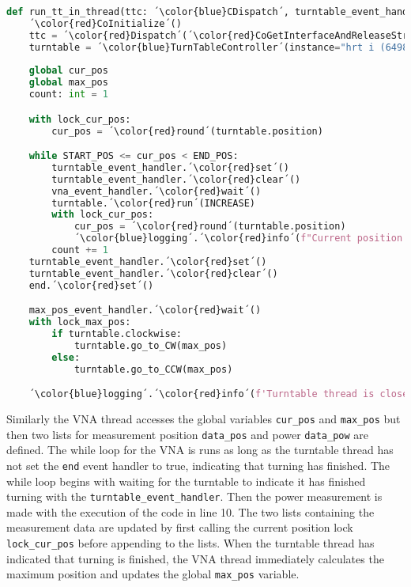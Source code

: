 \begin{lstlisting}[language=Python, caption=Thread function for running VNA.]
def run_tt_in_thread(ttc: ´\color{blue}CDispatch´, turntable_event_handler: ´\color{blue}Event´, vna_event_handler: ´\color{blue}Event´, end: ´\color{blue}Event´, ttc_id) -> None:
    ´\color{red}CoInitialize´()
    ttc = ´\color{red}Dispatch´(´\color{red}CoGetInterfaceAndReleaseStream´(ttc_id, IID_IDispatch))
    turntable = ´\color{blue}TurnTableController´(instance="hrt i (64980128)", ttc=ttc, clockwise=True, start_pos=START_POS)
    
    global cur_pos
    global max_pos
    count: int = 1

    with lock_cur_pos:
        cur_pos = ´\color{red}round´(turntable.position)

    while START_POS <= cur_pos < END_POS:
        turntable_event_handler.´\color{red}set´()
        turntable_event_handler.´\color{red}clear´()
        vna_event_handler.´\color{red}wait´()
        turntable.´\color{red}run´(INCREASE)
        with lock_cur_pos:
            cur_pos = ´\color{red}round´(turntable.position) 
            ´\color{blue}logging´.´\color{red}info´(f"Current position for {turntable.instance} is {cur_pos}.")
        count += 1
    turntable_event_handler.´\color{red}set´()
    turntable_event_handler.´\color{red}clear´()
    end.´\color{red}set´()

    max_pos_event_handler.´\color{red}wait´()
    with lock_max_pos:
        if turntable.clockwise:
            turntable.go_to_CW(max_pos)
        else:
            turntable.go_to_CCW(max_pos)

    ´\color{blue}logging´.´\color{red}info´(f'Turntable thread is closed. {count} positions measured.')
\end{lstlisting}

Similarly the VNA thread accesses the global variables \verb+cur_pos+ and \verb+max_pos+ but then two lists for measurement position \verb+data_pos+ and power \verb+data_pow+ are defined. The while loop for the VNA is runs as long as the turntable thread has not set the \verb+end+ event handler to true, indicating that turning has finished. The while loop begins with waiting for the turntable to indicate it has finished turning with the \verb+turntable_event_handler+. Then the power measurement is made with the execution of the code in line 10. The two lists containing the measurement data are updated by first calling the current position lock \verb+lock_cur_pos+ before appending to the lists. When the turntable thread has indicated that turning is finished, the VNA thread immediately calculates the maximum position and updates the global \verb+max_pos+ variable.

